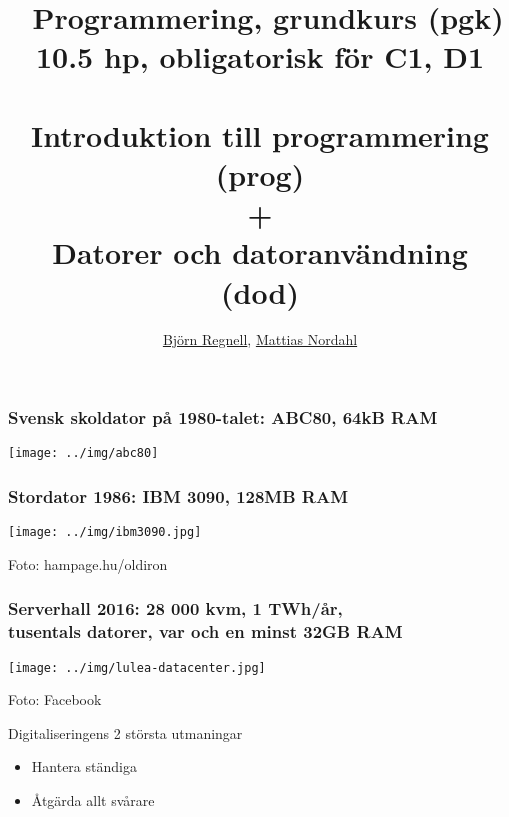 \documentclass{lecturesimple}
\title[Kort presentation av pgk \& dod, \DateOfShow]{
\CourseCode~Programmering, grundkurs (pgk)\\10.5 hp, obligatorisk för C1, D1\\ ~ \\  
Introduktion till programmering (prog) \\ + \\ Datorer och datoranvändning (dod)}
\author{\href{https://lunduniversity.github.io/bjornregnell}{Björn Regnell}, \href{https://cs.lth.se/nordahl-mattias/}{Mattias Nordahl}}
\institute{\href{https://cs.lth.se}{Datavetenskap}, LTH}
\date{\DateOfShow}
\begin{document}
\frame{\titlepage}

\begin{frame}\frametitle{Svensk skoldator på 1980-talet: ABC80, 64kB RAM}
  \begin{center}
      \texttt{[image: ../img/abc80]}
  \end{center}
  \end{frame}
  
  
  \begin{frame}\frametitle{Stordator 1986: IBM 3090, %
      128MB RAM}
  \begin{center}
      \texttt{[image: ../img/ibm3090.jpg]}
    
      {\fontsize{5}{5}\selectfont\color{gray}
      Foto: hampage.hu/oldiron
    }
  \end{center}
  \end{frame}
    
  \begin{frame}\frametitle{Serverhall 2016: 28 000 kvm, 1 TWh/år, \\tusentals datorer, var och en minst 32GB RAM}
    \begin{center}
      \texttt{[image: ../img/lulea-datacenter.jpg]}
    
      {\fontsize{5}{5}\selectfont\color{gray}
    Foto: Facebook
    }
    \end{center}
  \end{frame}
  


\begin{Slide}{Digitaliseringens 2 största utmaningar}
  \begin{itemize}\Large
    \item Hantera ständiga 
    \item Åtgärda allt svårare  
  \end{itemize}  
\end{Slide}


\end{document}
